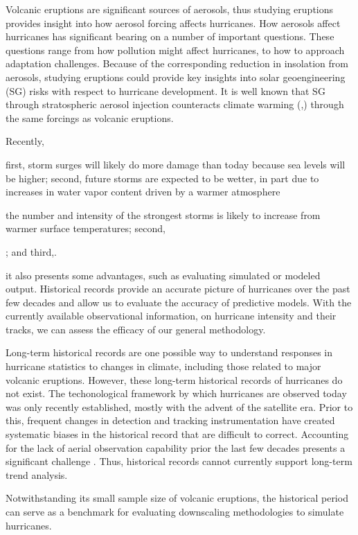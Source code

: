 Volcanic eruptions are significant sources of aerosols, thus studying
eruptions provides insight into how aerosol forcing affects
hurricanes. How aerosols affect hurricanes has significant bearing on
a number of important questions. These questions range from how
pollution might affect hurricanes, to how to approach adaptation
challenges. Because of the corresponding reduction in insolation from
aerosols, studying eruptions could provide key insights into solar
geoengineering (SG) risks with respect to hurricane development. It is
well known that SG through stratospheric aerosol injection counteracts
climate warming (\cite{wigley},\cite{crutzen}) through the same
forcings as volcanic eruptions.


Recently, 


 first, storm surges
will likely do more damage than today because sea levels will be
higher; second, future storms are expected to be wetter, in part due
to increases in water vapor content driven by a warmer atmosphere

the number and intensity of the strongest storms is
likely to increase from warmer surface temperatures; second,

; and third,.

it also presents some advantages, such as evaluating simulated or
modeled output. Historical records provide an accurate picture of
hurricanes over the past few decades and allow us to evaluate the
accuracy of predictive models. With the currently available
observational information, on hurricane intensity and their tracks, we
can assess the efficacy of our general methodology.

Long-term historical records are one possible way to understand
responses in hurricane statistics to changes in climate, including
those related to major volcanic eruptions. However, these long-term
historical records of hurricanes do not exist. The techonological
framework by which hurricanes are observed today was only recently
established, mostly with the advent of the satellite era. Prior to
this, frequent changes in detection and tracking instrumentation have
created systematic biases in the historical record that are difficult
to correct. Accounting for the lack of aerial observation capability
prior the last few decades presents a significant challenge
\cite{kerry_clivar}. Thus, historical records cannot currently support
long-term trend analysis.

Notwithstanding its small sample size of volcanic eruptions, the
historical period can serve as a benchmark for evaluating downscaling
methodologies to simulate hurricanes.


